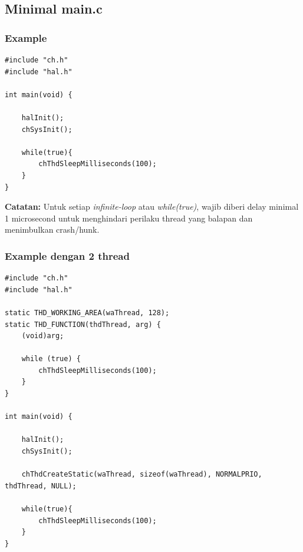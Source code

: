 \documentclass[table,dvipsnames]{beamer}
\begin{document}
	\subsection{Minimal main.c}
	\begin{frame}[fragile]
		\frametitle{Example}
		\begin{exampleblock}{}
			\begin{verbatim}
#include "ch.h"
#include "hal.h"

int main(void) {

	halInit();
	chSysInit();

	while(true){
		chThdSleepMilliseconds(100);
	}
}
			\end{verbatim}
		\end{exampleblock}

		\begin{exampleblock}{}
			\textbf{Catatan:} Untuk setiap \textit{infinite-loop} atau \textit{while(true){}},
			wajib diberi delay minimal 1 microsecond untuk menghindari perilaku thread yang balapan dan menimbulkan crash/hunk.
		\end{exampleblock}
	\end{frame}

	\begin{frame}[fragile]
		\frametitle{Example dengan 2 thread}
		\begin{exampleblock}{}
			\begin{verbatim}
#include "ch.h"
#include "hal.h"

static THD_WORKING_AREA(waThread, 128);
static THD_FUNCTION(thdThread, arg) {
	(void)arg;

	while (true) {
		chThdSleepMilliseconds(100);
	}
}

int main(void) {

	halInit();
	chSysInit();

	chThdCreateStatic(waThread, sizeof(waThread), NORMALPRIO, thdThread, NULL);

	while(true){
		chThdSleepMilliseconds(100);
	}
}
			\end{verbatim}
		\end{exampleblock}
	\end{frame}
\end{document}
